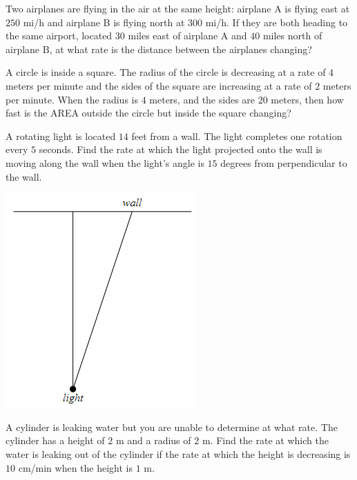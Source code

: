 \begin{exercise}

Two airplanes are flying in the air at the same height: airplane A is
flying east at \(250\) mi/h and airplane B is flying north at \(300\)
mi/h. If they are both heading to the same airport, located \(30\) miles
east of airplane A and \(40\) miles north of airplane B, at what rate is
the distance between the airplanes changing?

\end{exercise}
\vspace*{6\baselineskip}

\begin{exercise}

A circle is inside a square. The radius of the circle is decreasing at a
rate of \(4\) meters per minute and the sides of the square are
increasing at a rate of \(2\) meters per minute. When the radius is
\(4\) meters, and the sides are \(20\) meters, then how fast is the AREA
outside the circle but inside the square changing?

\end{exercise}
\vspace*{6\baselineskip}

\begin{exercise}

A rotating light is located \(14\) feet from a wall. The light completes
one rotation every \(5\) seconds. Find the rate at which the light
projected onto the wall is moving along the wall when the light's angle
is \(15\) degrees from perpendicular to the wall.

\includegraphics[scale=0.5]{img/image-20201007133107751.png}

\end{exercise}
\vspace*{6\baselineskip}

\begin{exercise}

A cylinder is leaking water but you are unable to determine at what
rate. The cylinder has a height of \(2\) m and a radius of \(2\) m. Find
the rate at which the water is leaking out of the cylinder if the rate
at which the height is decreasing is \(10\) cm/min when the height is
\(1\) m.

\end{exercise}

